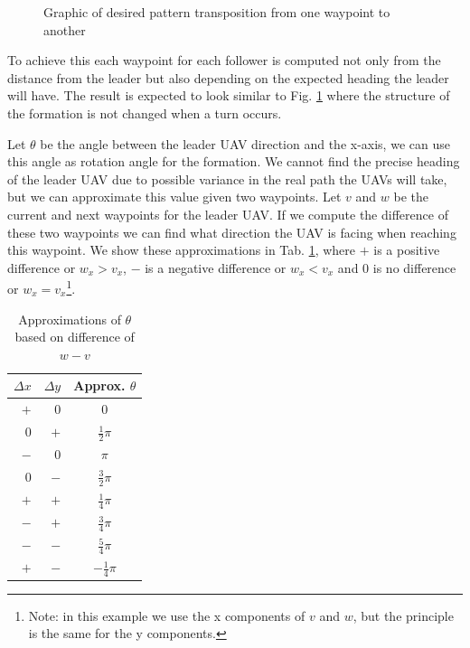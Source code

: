 \begin{figure}[h]
	\begin{center}
		
	\end{center}
	\caption{Graphic of desired pattern transposition from one waypoint to another}\label{fig:pf-1}
\end{figure}

To achieve this each waypoint for each follower is computed not only from the distance 
from the leader but also depending on the expected heading the leader will have. The 
result is expected to look similar to Fig. \ref{fig:pf-1} where the structure of
the formation is not changed when a turn occurs. 

Let $\theta$ be the angle between
the leader UAV direction and the x-axis, we can use this angle as rotation angle for 
the formation. We cannot find the precise heading of the leader UAV due to possible
variance in the real path the UAVs will take, but we can approximate this value given
two waypoints. Let $v$ and $w$ be the current and next waypoints for the leader UAV. 
If we compute the difference of these two waypoints we can find what direction the 
UAV is facing when reaching this waypoint. We show these approximations in Tab. \ref{tab:approx},
where $+$ is a positive difference or $w_x > v_x$, $-$ is a negative difference or $w_x < v_x$
and $0$ is no difference or $w_x = v_x$\footnote{Note: in this example we use the x components of $v$ and $w$, 
but the principle is the same for the y components.}.

\begin{table}
	\caption{Approximations of $\theta$ based on difference of $w - v$}\label{tab:approx}
	\begin{center}
		\begin{tabular}[c]{r|r|c}
			\hline
			\multicolumn{1}{c|}{\textbf{$\Delta x$}} & 
			\multicolumn{1}{c|}{\textbf{$\Delta y$}} &
			\multicolumn{1}{c}{Approx. \textbf{$\theta$}} \\
			\hline
			\hline
			$+$ & $0$ & $0$ \\
			\hline
			$0$ & $+$ & $\frac{1}{2}\pi$ \\
			\hline
			$-$ & $0$ & $\pi$ \\
			\hline
			$0$ & $-$ & $\frac{3}{2}\pi$ \\
			\hline
			$+$ & $+$ & $\frac{1}{4}\pi$ \\
			\hline
			$-$ & $+$ & $\frac{3}{4}\pi$ \\
			\hline
			$-$ & $-$ & $\frac{5}{4}\pi$ \\
			\hline
			$+$ & $-$ & $-\frac{1}{4}\pi$ \\
			\hline
		\end{tabular}
	\end{center}
\end{table}

